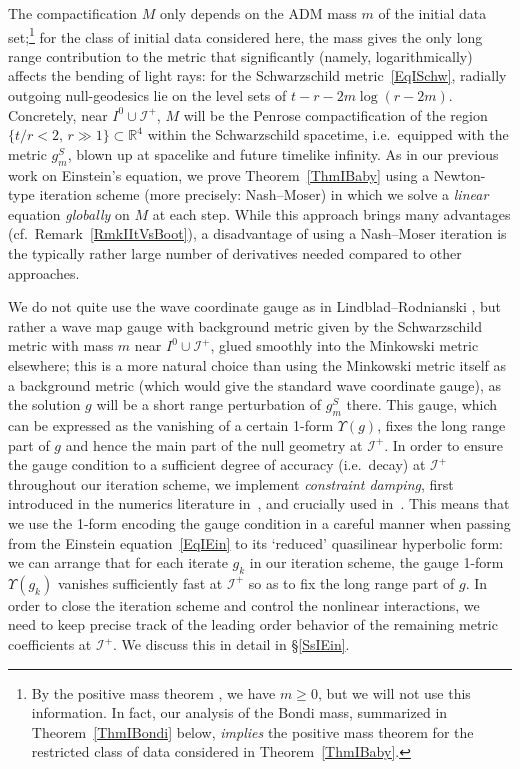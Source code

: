 \documentclass[reqno,11pt,letterpaper]{amsart}
\numberwithin{equation}{section}
\numberwithin{figure}{section}
\theoremstyle{definition}
\theoremstyle{remark}
\newcommand{\ms}{\mathscr}
\newcommand{\scri}{\ms I}
\newcommand{\R}{\mathbb{R}}
\newcommand{\Ups}{\Upsilon}
\begin{document}
The compactification $M$ only depends on the ADM mass $m$ of the initial data set;\footnote{By the positive mass theorem \cite{SchoenYauPMT,WittenPMT}, we have $m\geq 0$, but we will not use this information. In fact, our analysis of the Bondi mass, summarized in Theorem~\ref{ThmIBondi} below, \emph{implies} the positive mass theorem for the restricted class of data considered in Theorem~\ref{ThmIBaby}.} for the class of initial data considered here, the mass gives the only long range contribution to the metric that significantly (namely, logarithmically) affects the bending of light rays: for the Schwarzschild metric~\eqref{EqISchw}, radially outgoing null-geodesics lie on the level sets of $t-r-2 m\log(r-2 m)$. Concretely, near $I^0\cup\scri^+$, $M$ will be the Penrose compactification of the region $\{t/r<2,\,r\gg 1\}\subset\R^4$ within the Schwarzschild spacetime, i.e.\ equipped with the metric $g_m^S$, blown up at spacelike and future timelike infinity. As in our previous work \cite{HintzVasyKdSStability,HintzKNdSStability} on Einstein's equation, we prove Theorem~\ref{ThmIBaby} using a Newton-type iteration scheme (more precisely: Nash--Moser) in which we solve a \emph{linear} equation \emph{globally} on $M$ at each step. While this approach brings many advantages (cf.\ Remark~\ref{RmkIItVsBoot}), a disadvantage of using a Nash--Moser iteration is the typically rather large number of derivatives needed compared to other approaches.


We do not quite use the wave coordinate gauge as in Lindblad--Rodnianski \cite{LindbladRodnianskiGlobalStability,LindbladRodnianskiGlobalExistence}, but rather a wave map gauge with background metric given by the Schwarzschild metric with mass $m$ near $I^0\cup\scri^+$, glued smoothly into the Minkowski metric elsewhere; this is a more natural choice than using the Minkowski metric itself as a background metric (which would give the standard wave coordinate gauge), as the solution $g$ will be a short range perturbation of $g_m^S$ there. This gauge, which can be expressed as the vanishing of a certain 1-form $\Ups(g)$, fixes the long range part of $g$ and hence the main part of the null geometry at $\scri^+$. In order to ensure the gauge condition to a sufficient degree of accuracy (i.e.\ decay) at $\scri^+$ throughout our iteration scheme, we implement \emph{constraint damping}, first introduced in the numerics literature in~\cite{GundlachCalabreseHinderMartinConstraintDamping}, and crucially used in~\cite{HintzVasyKdSStability}. This means that we use the 1-form encoding the gauge condition in a careful manner when passing from the Einstein equation~\eqref{EqIEin} to its `reduced' quasilinear hyperbolic form: we can arrange that for each iterate $g_k$ in our iteration scheme, the gauge 1-form $\Ups(g_k)$ vanishes sufficiently fast at $\scri^+$ so as to fix the long range part of $g$. In order to close the iteration scheme and control the nonlinear interactions, we need to keep precise track of the leading order behavior of the remaining metric coefficients at $\scri^+$. We discuss this in detail in \S\ref{SsIEin}.
\end{document}
